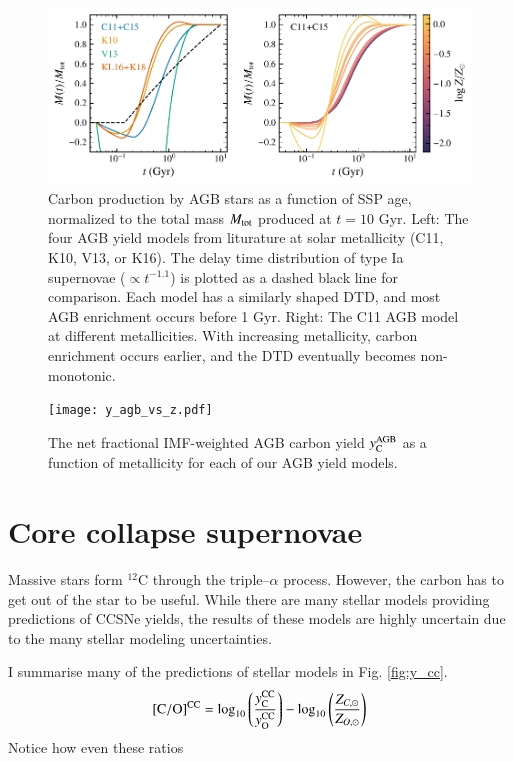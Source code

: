 \documentclass[12pt,oneside]{report}
\newcommand{\Ycagb}{\ensuremath{y_{\rm C}^{\rm AGB}}}
\newcommand{\sun}{\ensuremath{\odot}}
\begin{document}
\begin{figure}
    \includegraphics[scale=1]{y_agb_t2.pdf}

    \caption[AGB yields delay time distribution]{
        Carbon production by AGB stars as a function of SSP age, normalized to the total mass $M_{\rm tot}$ produced at $t=10$ Gyr. Left: The four AGB yield models from liturature  at solar metallicity (C11, K10, V13, or K16). The delay time distribution of type Ia supernovae ($\propto t^{-1.1}$) is plotted as a dashed black line for comparison. Each model has a similarly shaped DTD, and most AGB enrichment occurs before 1 Gyr. Right: The C11 AGB model at different metallicities. With increasing metallicity, carbon enrichment occurs earlier, and the DTD eventually becomes non-monotonic.
    }

\end{figure}

\begin{figure}
    \centering
    
    \texttt{[image: y\_agb\_vs\_z.pdf]}

    \caption[AGB yield metallicity dependence]{The net fractional IMF-weighted AGB carbon yield $\Ycagb$ as a function of metallicity for each of our AGB yield models.
    }

\end{figure}

\section{Core collapse supernovae}


Massive stars form $^{12}$C through the triple--$\alpha$ process. However, the carbon has to get out of the star to be useful. 
While there are many stellar models providing predictions of CCSNe yields, the results of these models are highly uncertain due to the many stellar modeling uncertainties. 

I summarise many of the predictions of stellar models in Fig. \ref{fig:y_cc}. 
\begin{equation}\label{eq:c_mg_cc}
    {\rm [C/O]^{CC}} = \log_{10}\left( \frac{y_{\rm C}^{\rm CC}}{y_{\rm O}^{\rm CC}}\right) - \log_{10} \left( \frac{Z_{C, \sun }}{Z_{O, \sun }} \right)
\end{equation}
Notice how even these ratios 
\end{document}
